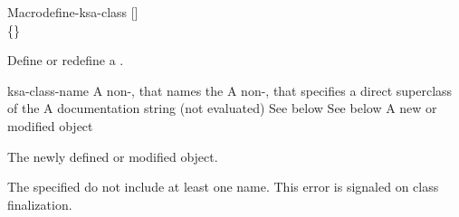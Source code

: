 \documentclass[10pt,twoside,english,pdftex]{article}
\begin{document}
\begin{functiondoc}{Macro}{define-ksa-class}%
   { 
     [] \\
     \{\}\superstar{}
     }
%
%
%

\fnsyntax

\fnpurpose Define or redefine a .

\fnpackage {}

\fnmodule {}

\fnargs
\begin{args}{ksa-class-name}
 A non-\nil,  that names the
 A non-\nil,  that specifies a
direct superclass of the  
\arg[documentation] A documentation string (not evaluated)
 See below
 See below
 A new or modified  object
\end{args}

\fnreturns The newly defined or modified  object.

\fnerrors The specified  do not include at
least one  name.  This error is signaled on class
finalization.


\end{functiondoc}
\end{document}
